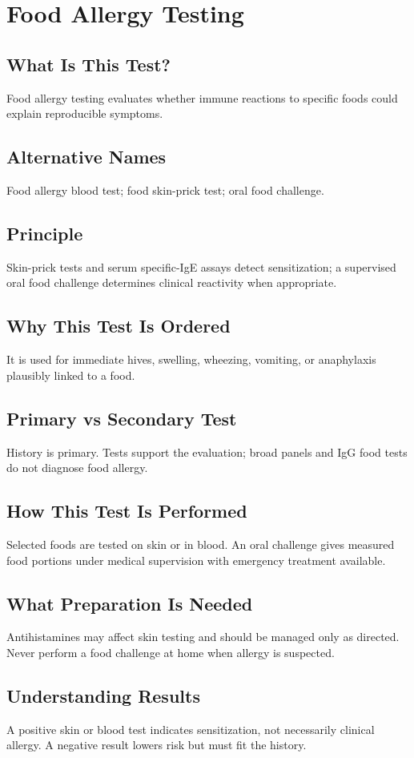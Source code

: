 \chapter{Food Allergy Testing}
\section*{What Is This Test?} Food allergy testing evaluates whether immune reactions to specific foods could explain reproducible symptoms.
\section*{Alternative Names} Food allergy blood test; food skin-prick test; oral food challenge.
\section*{Principle} Skin-prick tests and serum specific-IgE assays detect sensitization; a supervised oral food challenge determines clinical reactivity when appropriate.
\section*{Why This Test Is Ordered} It is used for immediate hives, swelling, wheezing, vomiting, or anaphylaxis plausibly linked to a food.
\section*{Primary vs Secondary Test} History is primary. Tests support the evaluation; broad panels and IgG food tests do not diagnose food allergy.
\section*{How This Test Is Performed} Selected foods are tested on skin or in blood. An oral challenge gives measured food portions under medical supervision with emergency treatment available.
\section*{What Preparation Is Needed} Antihistamines may affect skin testing and should be managed only as directed. Never perform a food challenge at home when allergy is suspected.
\section*{Understanding Results} A positive skin or blood test indicates sensitization, not necessarily clinical allergy. A negative result lowers risk but must fit the history.
